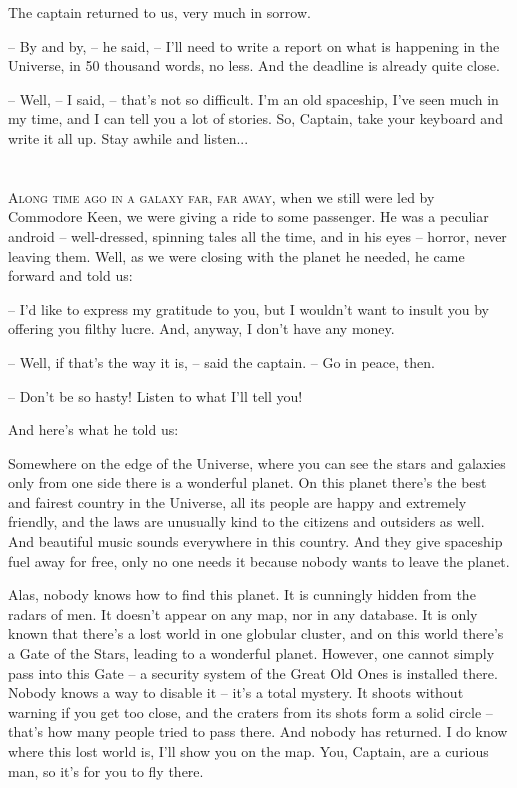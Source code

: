 \documentclass[ebook,twoside,final,openright]{memoir}
\begin{document}
\par
The captain returned to us, very much in sorrow.\par
– By and by, – he said, – I’ll need to write a report on what is happening in the Universe, in 50 thousand words, no less. And the deadline is already quite close.\par
– Well, – I said, – that’s not so difficult. I'm an old spaceship, I’ve seen much in my time, and I can tell you a lot of stories. So, Captain, take your keyboard and write it all up. Stay awhile and listen...
\chapter{}
\par
\lettrine{A}{long time ago in a galaxy far, far away,} when we still were led by Commodore Keen, we were giving a ride to some passenger. He was a peculiar android – well-dressed, spinning tales all the time, and in his eyes – horror, never leaving them. Well, as we were closing with the planet he needed, he came forward and told us: \par
\par
– I'd like to express my gratitude to you, but I wouldn’t want to insult you by offering you filthy lucre. And, anyway, I don’t have any money.\par
– Well, if that’s the way it is, – said the captain. – Go in peace, then. \par
– Don’t be so hasty! Listen to what I’ll tell you! \par
 And here’s what he told us:\par
\par
Somewhere on the edge of the Universe, where you can see the stars and galaxies only from one side there is a wonderful planet. On this planet there’s the best and fairest country in the Universe, all its people are happy and extremely friendly, and the laws are unusually kind to the citizens and outsiders as well. And beautiful music sounds everywhere in this country. And they give spaceship fuel away for free, only no one needs it because nobody wants to leave the planet. \par
Alas, nobody knows how to find this planet. It is cunningly hidden from the radars of men. It doesn’t appear on any map, nor in any database. It is only known that there’s a lost world in one globular cluster, and on this world there’s a Gate of the Stars, leading to a wonderful planet. However, one cannot simply pass into this Gate – a security system of the Great Old Ones is installed there. Nobody knows a way to disable it – it’s a total mystery. It shoots without warning if you get too close, and the craters from its shots form a solid circle – that's how many people tried to pass there. And nobody has returned. I do know where this lost world is, I'll show you on the map. You, Captain, are a curious man, so it’s for you to fly there.\par
\end{document}
